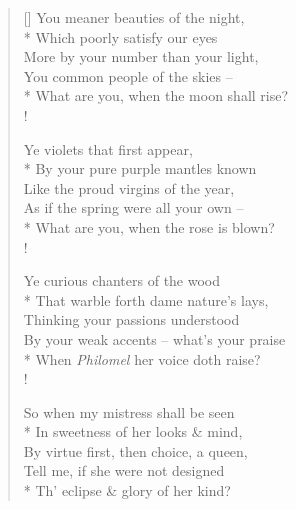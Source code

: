 \documentclass[MAIN]{subfiles}
\begin{document}
\settowidth{\versewidth}{You meaner beauties of the night,}
\begin{verse}[\versewidth]
You meaner beauties of the night,\\*
\vin Which poorly satisfy our eyes\\
More by your number than your light,\\
\vin You common people of the skies --\\*
What are you, when the moon shall rise?\\!

Ye violets that first appear,\\*
\vin By your pure purple mantles known\\
Like the proud virgins of the year,\\
\vin As if the spring were all your own --\\*
What are you, when the rose is blown?\\!

Ye curious chanters of the wood\\*
\vin That warble forth dame nature's lays,\\
Thinking your passions understood\\
\vin By your weak accents -- what's your praise\\*
When \emph{Philomel} her voice doth raise?\\!

So when my mistress shall be seen\\*
\vin In sweetness of her looks \& mind,\\
By virtue first, then choice, a queen,\\
\vin Tell me, if she were not designed\\*
Th' eclipse \& glory of her kind?
\end{verse}
\end{document}
